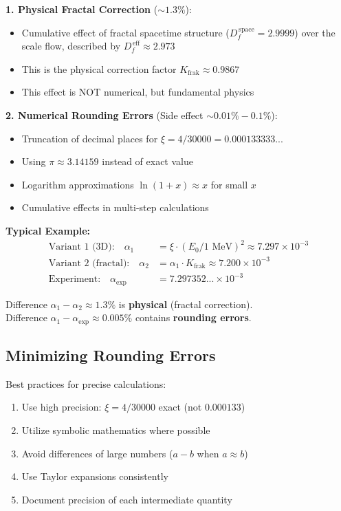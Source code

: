 	\begin{tcolorbox}[colback=green!5!white,colframe=green!75!black,title={Two Types of Corrections in T0 Calculations}]
		\textbf{1. Physical Fractal Correction} ($\sim 1.3\%$):
		\begin{itemize}
			\item Cumulative effect of fractal spacetime structure ($D_f^{\,\text{space}} = 2.9999$) over the scale flow, described by $D_f^{\,\text{eff}} \approx 2.973$
			\item This is the physical correction factor $K_{\text{frak}} \approx 0.9867$
			\item This effect is NOT numerical, but fundamental physics
		\end{itemize}
		
		\textbf{2. Numerical Rounding Errors} (Side effect $\sim 0.01\% - 0.1\%$):
		\begin{itemize}
			\item Truncation of decimal places for $\xi = 4/30000 = 0.000133333...$
			\item Using $\pi \approx 3.14159$ instead of exact value
			\item Logarithm approximations $\ln(1+x) \approx x$ for small $x$
			\item Cumulative effects in multi-step calculations
		\end{itemize}
		
		\textbf{Typical Example:}
		\begin{align}
			\text{Variant 1 (3D):} \quad \alpha_1 &= \xi \cdot (E_0/1\text{ MeV})^2 \approx 7.297 \times 10^{-3} \\
			\text{Variant 2 (fractal):} \quad \alpha_2 &= \alpha_1 \cdot K_{\text{frak}} \approx 7.200 \times 10^{-3} \\
			\text{Experiment:} \quad \alpha_{\text{exp}} &= 7.297352... \times 10^{-3}
		\end{align}
		
		Difference $\alpha_1 - \alpha_2 \approx 1.3\%$ is \textbf{physical} (fractal correction).\\
		Difference $\alpha_1 - \alpha_{\text{exp}} \approx 0.005\%$ contains \textbf{rounding errors}.
	\end{tcolorbox}
	
	\subsection{Minimizing Rounding Errors}
	
	Best practices for precise calculations:
	\begin{enumerate}
		\item Use high precision: $\xi = 4/30000$ exact (not $0.000133$)
		\item Utilize symbolic mathematics where possible
		\item Avoid differences of large numbers ($a - b$ when $a \approx b$)
		\item Use Taylor expansions consistently
		\item Document precision of each intermediate quantity
	\end{enumerate}
	
